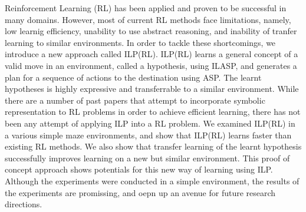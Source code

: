 Reinforcement Learning (RL) has been applied and proven to be successful in many domains.
However, most of current RL methods face limitations, namely, low learnig efficiency, 
unability to use abstract reasoning, and inability of tranfer learning to similar environments.
In order to tackle these shortcomings, we introduce a new approach called ILP(RL).
ILP(RL) learns a general concept of a valid move in an environment, called a hypothesis, using ILASP, and generates a plan for a sequence of actions to the destination using ASP.
The learnt hypotheses is highly expressive and transferrable to a similar environment. 
While there are a number of past papers that attempt to incorporate symbolic representation to RL problems in order to achieve efficient learning, 
there has not been any attempt of applying ILP into a RL problem.
We examined ILP(RL) in a various simple maze environments, and show that ILP(RL) learns faster than existing RL methods.
We also show that transfer learning of the learnt hypothesis successfully improves learning on a new but similar environment.
This proof of concept approach shows potentials for this new way of learning using ILP.
Although the experiments were conducted in a simple environment, the results of the experiments are promissing, and oepn up an avenue for future research directions.
